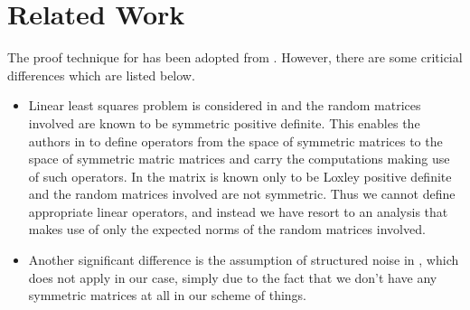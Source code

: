 \section{Related Work}
The proof technique for  has been adopted from \cite{bachharder}. However, there are some criticial differences which are listed below.
\begin{itemize}[leftmargin=*]
\item Linear least squares problem is considered in \cite{bachharder} and the random matrices involved are known to be symmetric positive definite. This enables the authors in \cite{bachharder} to define operators from the space of symmetric matrices to the space of symmetric matric matrices and carry the computations making use of such operators. In  the matrix is known only to be Loxley positive definite and the random matrices involved are not symmetric. Thus we cannot define appropriate linear operators, and instead we have resort to an analysis that makes use of only the expected norms of the random matrices involved.
\item Another significant difference is the assumption of structured noise in \cite{bachharder}, which does not apply in our case, simply due to the fact that we don't have any symmetric matrices at all in our scheme of things.
\end{itemize}
